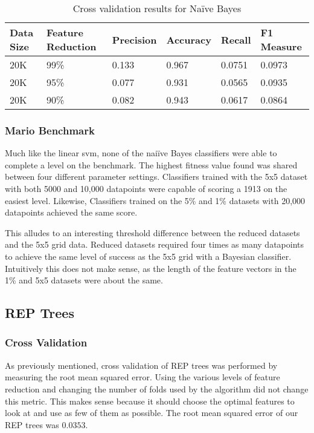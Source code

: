 \documentclass[]{article}   %
\begin{document}
\begin{table}[h!]
	\begin{center}
		\caption{Cross validation results for Na\"{i}ve Bayes}
		\begin{tabular}{l | l || l | l | l | l }
		\hline
		Data Size & Feature Reduction & Precision & Accuracy & Recall & F1 Measure \\
		\hline
		20K & 99\% & 0.133 & 0.967 & 0.0751 & 0.0973 \\
		20K & 95\% & 0.077 & 0.931 & 0.0565 & 0.0935 \\
		20K & 90\% & 0.082 & 0.943 & 0.0617 & 0.0864 \\
		\hline
		\end{tabular}
	\end{center}
\end{table}

\subsubsection{Mario Benchmark}
Much like the linear svm, none of the nai\"{i}ve Bayes classifiers were able to complete a level on the benchmark. The highest fitness
value found was shared between four different parameter settings. Classifiers trained with the 5x5 dataset with both 5000 and 10,000
datapoints were capable of scoring a 1913 on the easiest level. Likewise, Classifiers trained on the 5\% and 1\% datasets with 20,000
datapoints achieved the same score.

This alludes to an interesting threshold difference between the reduced datasets and the 5x5 grid data. Reduced datasets required four
times as many datapoints to achieve the same level of success as the 5x5 grid with a Bayesian classifier. Intuitively this does not make sense,
as the length of the feature vectors in the 1\% and 5x5 datasets were about the same. 

\subsection{REP Trees}
\subsubsection{Cross Validation}
As previously mentioned, cross validation of REP trees was performed by measuring the root mean squared error. Using the various levels of feature
reduction and changing the number of folds used by the algorithm did not change this metric. This makes sense because it should choose the optimal
features to look at and use as few of them as possible. The root mean squared error of our REP trees was $0.0353$.
\end{document}
